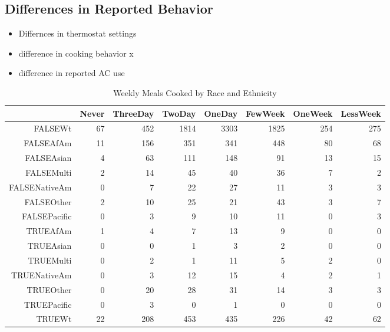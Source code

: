 \documentclass{article}
\begin{document}
\subsection{Differences in Reported Behavior}
  
  \begin{itemize}
    \item Differnces in thermostat settings
    \item difference in cooking behavior x
    \item difference in reported AC use

  \end{itemize}
  
  
\begin{table}[ht]
\centering
\begin{tabular}{rrrrrrrr}
  \hline
 & Never & ThreeDay & TwoDay & OneDay & FewWeek & OneWeek & LessWeek \\ 
  \hline
FALSEWt &  67 & 452 & 1814 & 3303 & 1825 & 254 & 275 \\ 
  FALSEAfAm &  11 & 156 & 351 & 341 & 448 &  80 &  68 \\ 
  FALSEAsian &   4 &  63 & 111 & 148 &  91 &  13 &  15 \\ 
  FALSEMulti &   2 &  14 &  45 &  40 &  36 &   7 &   2 \\ 
  FALSENativeAm &   0 &   7 &  22 &  27 &  11 &   3 &   3 \\ 
  FALSEOther &   2 &  10 &  25 &  21 &  43 &   3 &   7 \\ 
  FALSEPacific &   0 &   3 &   9 &  10 &  11 &   0 &   3 \\ 
  TRUEAfAm &   1 &   4 &   7 &  13 &   9 &   0 &   0 \\ 
  TRUEAsian &   0 &   0 &   1 &   3 &   2 &   0 &   0 \\ 
  TRUEMulti &   0 &   2 &   1 &  11 &   5 &   2 &   0 \\ 
  TRUENativeAm &   0 &   3 &  12 &  15 &   4 &   2 &   1 \\ 
  TRUEOther &   0 &  20 &  28 &  31 &  14 &   3 &   3 \\ 
  TRUEPacific &   0 &   3 &   0 &   1 &   0 &   0 &   0 \\ 
  TRUEWt &  22 & 208 & 453 & 435 & 226 &  42 &  62 \\ 
   \hline
\end{tabular}
\caption{Weekly Meals Cooked by Race and Ethnicity} 
\label{tab:Cooking}
\end{table}
\end{document}
